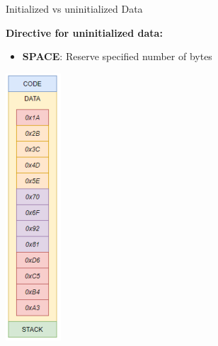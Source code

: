 \begin{concept}{Initialized vs uninitialized Data}
\begin{minipage}{0.75\linewidth}
\textbf{Directive for uninitialized data:}
\begin{itemize}
  \item \textbf{SPACE}: Reserve specified number of bytes
\end{itemize}
\end{minipage}
\hspace{2mm}
\begin{minipage}{0.15\linewidth}
  \vspace{-15mm}
\includegraphics[width=\linewidth]{images/uninit_data.png}
\end{minipage}  
\end{concept}

